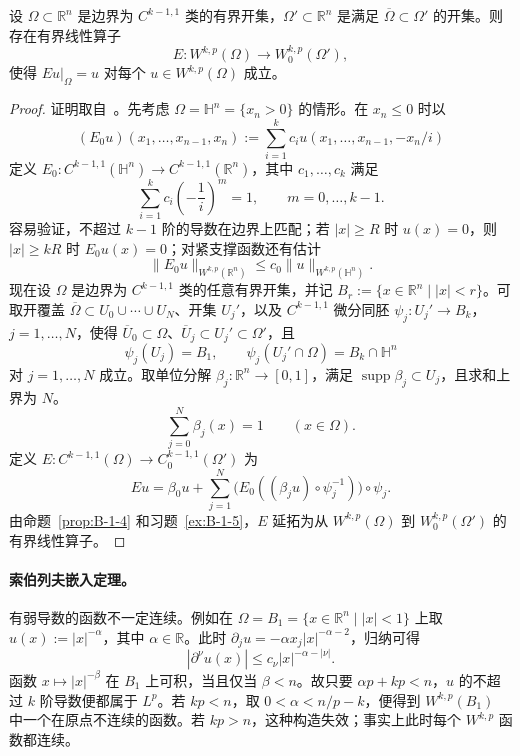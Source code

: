 \begin{proposition}\label{prop:B-1-9}
设 $\Omega\subset\mathbb R^n$ 是边界为 $C^{k-1,1}$ 类的有界开集，$\Omega'\subset\mathbb R^n$ 是满足 $\overline\Omega\subset\Omega'$ 的开集。则存在有界线性算子
\[
E:W^{k,p}(\Omega)\to W_0^{k,p}(\Omega'),
\]
使得 $Eu|_\Omega=u$ 对每个 $u\in W^{k,p}(\Omega)$ 成立。
\end{proposition}
\begin{proof}
证明取自~。先考虑 $\Omega=\mathbb H^n=\{x_n>0\}$ 的情形。在 $x_n\le0$ 时以
\[
(E_0u)(x_1,\ldots,x_{n-1},x_n):=\sum_{i=1}^kc_i u(x_1,\ldots,x_{n-1},-x_n/i)
\]
定义 $E_0:C^{k-1,1}(\mathbb H^n)\to C^{k-1,1}(\mathbb R^n)$，其中 $c_1,\ldots,c_k$ 满足
\[
\sum_{i=1}^kc_i\left(-\frac1i\right)^m=1,\qquad m=0,\ldots,k-1.
\]
容易验证，不超过 $k-1$ 阶的导数在边界上匹配；若 $|x|\ge R$ 时 $u(x)=0$，则 $|x|\ge kR$ 时 $E_0u(x)=0$；对紧支撑函数还有估计
\[
\|E_0u\|_{W^{k,p}(\mathbb R^n)}\le c_0\|u\|_{W^{k,p}(\mathbb H^n)}.
\]
现在设 $\Omega$ 是边界为 $C^{k-1,1}$ 类的任意有界开集，并记 $B_r:=\{x\in\mathbb R^n\mid |x|<r\}$。可取开覆盖 $\overline\Omega\subset U_0\cup\cdots\cup U_N$、开集 $U_j'$，以及 $C^{k-1,1}$ 微分同胚 $\psi_j:U_j'\to B_k$，$j=1,\ldots,N$，使得 $\overline U_0\subset\Omega$、$\overline U_j\subset U_j'\subset\Omega'$，且
\[
\psi_j(U_j)=B_1,\qquad\psi_j(U_j'\cap\Omega)=B_k\cap\mathbb H^n
\]
对 $j=1,\ldots,N$ 成立。取单位分解 $\beta_j:\mathbb R^n\to[0,1]$，满足 $\operatorname{supp}\beta_j\subset U_j$，且求和上界为 $N$。
\[
\sum_{j=0}^{N}\beta_j(x)=1\qquad(x\in\Omega).
\]
定义 $E:C^{k-1,1}(\Omega)\to C_0^{k-1,1}(\Omega')$ 为
\[
Eu=\beta_0u+\sum_{j=1}^N\bigl(E_0((\beta_ju)\circ\psi_j^{-1})\bigr)\circ\psi_j.
\]
由命题~\ref{prop:B-1-4} 和习题~\ref{ex:B-1-5}，$E$ 延拓为从 $W^{k,p}(\Omega)$ 到 $W_0^{k,p}(\Omega')$ 的有界线性算子。
\end{proof}

\paragraph{索伯列夫嵌入定理。} 有弱导数的函数不一定连续。例如在 $\Omega=B_1=\{x\in\mathbb R^n\mid |x|<1\}$ 上取 $u(x):=|x|^{-\alpha}$，其中 $\alpha\in\mathbb R$。此时 $\partial_j u=-\alpha x_j|x|^{-\alpha-2}$，归纳可得
\[
|\partial^\nu u(x)|\le c_\nu|x|^{-\alpha-|\nu|}.
\]
函数 $x\mapsto|x|^{-\beta}$ 在 $B_1$ 上可积，当且仅当 $\beta<n$。故只要 $\alpha p+kp<n$，$u$ 的不超过 $k$ 阶导数便都属于 $L^p$。若 $kp<n$，取 $0<\alpha<n/p-k$，便得到 $W^{k,p}(B_1)$ 中一个在原点不连续的函数。若 $kp>n$，这种构造失效；事实上此时每个 $W^{k,p}$ 函数都连续。

